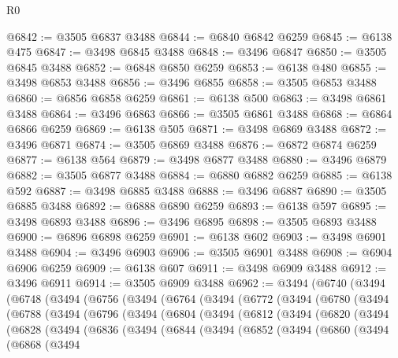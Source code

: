 \begin{lexlean}{R0}
\begin{coremodule}
@6842 := @3505 @6837 @3488
@6844 := @6840 @6842 @6259
@6845 := @6138 @475
@6847 := @3498 @6845 @3488
@6848 := @3496 @6847
@6850 := @3505 @6845 @3488
@6852 := @6848 @6850 @6259
@6853 := @6138 @480
@6855 := @3498 @6853 @3488
@6856 := @3496 @6855
@6858 := @3505 @6853 @3488
@6860 := @6856 @6858 @6259
@6861 := @6138 @500
@6863 := @3498 @6861 @3488
@6864 := @3496 @6863
@6866 := @3505 @6861 @3488
@6868 := @6864 @6866 @6259
@6869 := @6138 @505
@6871 := @3498 @6869 @3488
@6872 := @3496 @6871
@6874 := @3505 @6869 @3488
@6876 := @6872 @6874 @6259
@6877 := @6138 @564
@6879 := @3498 @6877 @3488
@6880 := @3496 @6879
@6882 := @3505 @6877 @3488
@6884 := @6880 @6882 @6259
@6885 := @6138 @592
@6887 := @3498 @6885 @3488
@6888 := @3496 @6887
@6890 := @3505 @6885 @3488
@6892 := @6888 @6890 @6259
@6893 := @6138 @597
@6895 := @3498 @6893 @3488
@6896 := @3496 @6895
@6898 := @3505 @6893 @3488
@6900 := @6896 @6898 @6259
@6901 := @6138 @602
@6903 := @3498 @6901 @3488
@6904 := @3496 @6903
@6906 := @3505 @6901 @3488
@6908 := @6904 @6906 @6259
@6909 := @6138 @607
@6911 := @3498 @6909 @3488
@6912 := @3496 @6911
@6914 := @3505 @6909 @3488
@6962 := @3494
    (@6740
      (@3494
        (@6748
          (@3494
            (@6756
              (@3494
                (@6764
                  (@3494
                    (@6772
                      (@3494
                        (@6780
                          (@3494
                            (@6788
                              (@3494
                                (@6796
                                  (@3494
                                    (@6804
                                      (@3494
                                        (@6812
                                          (@3494
                                            (@6820
                                              (@3494
                                                (@6828
                                                  (@3494
                                                    (@6836
                                                      (@3494
                                                        (@6844
                                                          (@3494
                                                            (@6852
                                                              (@3494
                                                                (@6860
                                                                  (@3494
                                                                    (@6868
                                                                      (@3494

\end{coremodule}
\end{lexlean}
